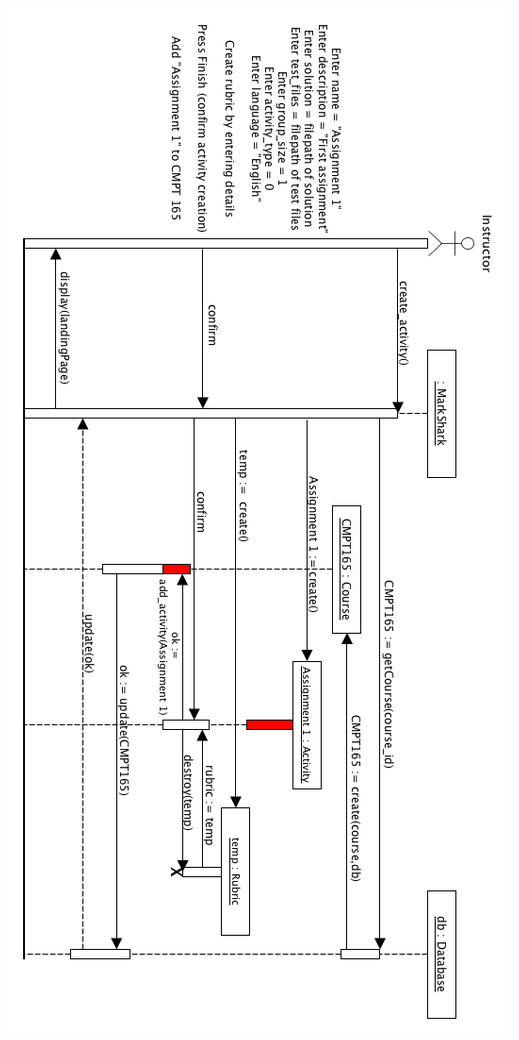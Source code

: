 \documentclass{article}
\begin{document}
\centerline{\includegraphics[scale=0.55]{../images/designDocImages/sequenceDiag.png}}
\end{document}
